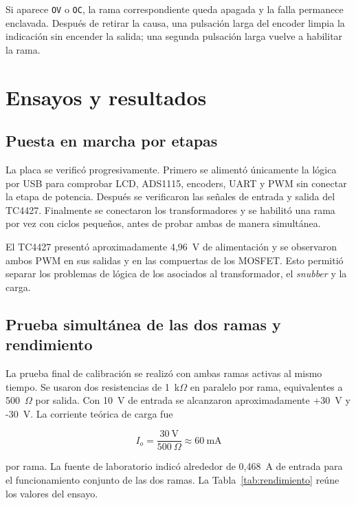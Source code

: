 \documentclass[conference]{IEEEtran}
\begin{document}
Si aparece \texttt{OV} o \texttt{OC}, la rama correspondiente queda apagada y la falla permanece enclavada. Después de retirar la causa, una pulsación larga del encoder limpia la indicación sin encender la salida; una segunda pulsación larga vuelve a habilitar la rama.

\section{Ensayos y resultados}

\subsection{Puesta en marcha por etapas}

La placa se verificó progresivamente. Primero se alimentó únicamente la lógica por USB para comprobar LCD, ADS1115, encoders, UART y PWM sin conectar la etapa de potencia. Después se verificaron las señales de entrada y salida del TC4427. Finalmente se conectaron los transformadores y se habilitó una rama por vez con ciclos pequeños, antes de probar ambas de manera simultánea.

El TC4427 presentó aproximadamente 4,96~V de alimentación y se observaron ambos PWM en sus salidas y en las compuertas de los MOSFET. Esto permitió separar los problemas de lógica de los asociados al transformador, el \textit{snubber} y la carga.

\subsection{Prueba simultánea de las dos ramas y rendimiento}

La prueba final de calibración se realizó con ambas ramas activas al mismo tiempo. Se usaron dos resistencias de 1~k$\Omega$ en paralelo por rama, equivalentes a 500~$\Omega$ por salida. Con 10~V de entrada se alcanzaron aproximadamente +30~V y -30~V. La corriente teórica de carga fue

\begin{equation}
I_o=\frac{30\ \mathrm{V}}{500\ \Omega}\approx60\ \mathrm{mA}
\end{equation}

por rama. La fuente de laboratorio indicó alrededor de 0,468~A de entrada para el funcionamiento conjunto de las dos ramas. La Tabla~\ref{tab:rendimiento} reúne los valores del ensayo.
\end{document}
